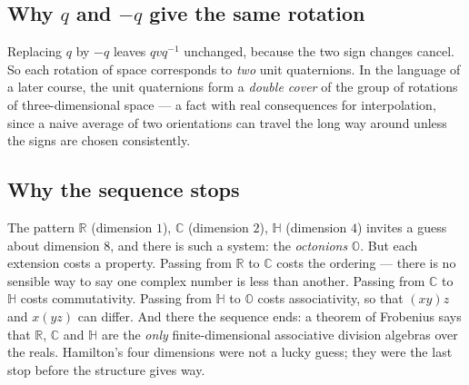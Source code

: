 \documentclass[11pt]{article}
\theoremstyle{definition}
\theoremstyle{remark}
\newcommand{\R}{\mathbb{R}}
\newcommand{\C}{\mathbb{C}}
\newcommand{\Hq}{\mathbb{H}}
\begin{document}
\subsection*{Why $q$ and $-q$ give the same rotation}
Replacing $q$ by $-q$ leaves $qvq^{-1}$ unchanged, because the two sign changes
cancel. So each rotation of space corresponds to \emph{two} unit quaternions. In
the language of a later course, the unit quaternions form a \emph{double cover}
of the group of rotations of three-dimensional space --- a fact with real
consequences for interpolation, since a naive average of two orientations can
travel the long way around unless the signs are chosen consistently.

\subsection*{Why the sequence stops}
The pattern $\R$ (dimension $1$), $\C$ (dimension $2$), $\Hq$ (dimension $4$)
invites a guess about dimension $8$, and there is such a system: the
\emph{octonions} $\mathbb{O}$. But each extension costs a property. Passing from
$\R$ to $\C$ costs the ordering --- there is no sensible way to say one complex
number is less than another. Passing from $\C$ to $\Hq$ costs commutativity.
Passing from $\Hq$ to $\mathbb{O}$ costs associativity, so that $(xy)z$ and
$x(yz)$ can differ. And there the sequence ends: a theorem of Frobenius says
that $\R$, $\C$ and $\Hq$ are the \emph{only} finite-dimensional associative
division algebras over the reals. Hamilton's four dimensions were not a lucky
guess; they were the last stop before the structure gives way.
\end{document}
